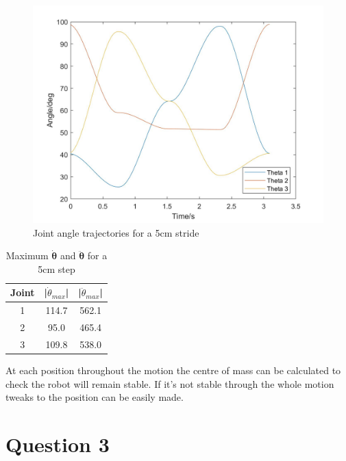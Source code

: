 \documentclass[twoside,twocolumn]{article}
\begin{document}
\begin{figure}[h]
  \centering
    \includegraphics[width=\linewidth]{5cmtraj}
  \caption{Joint angle trajectories for a 5cm stride}
  \label{fig:jt}
\end{figure}


\begin{table}[h]
\centering 
\begin{tabular}{ c | c | c }
Joint&|$\dot{\theta}_{max}$|&|$\ddot{\theta}_{max}$|\\ 

\midrule
1&114.7&562.1\\
2&95.0&465.4\\
3&109.8&538.0\\
\end{tabular}
\caption{Maximum $\boldsymbol{\dot{\theta}}$ and $\boldsymbol{\ddot{\theta}}$ for a 5cm step}
\label{table:max}
\end{table}

At each position throughout the motion the centre of mass can be calculated to check the robot will remain stable. If it's not stable through the whole motion tweaks to the position can be easily made. 


\section{Question 3}
\end{document}
